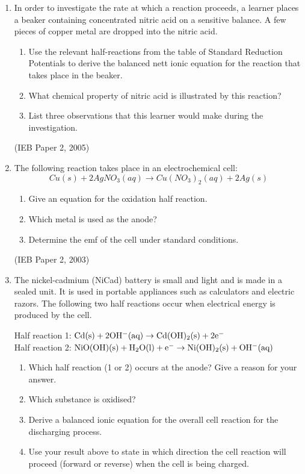 {\begin{enumerate}
\begin{enumerate}
	\end{enumerate}


\item{In order to investigate the rate at which a reaction proceeds, a learner places a beaker containing concentrated nitric acid on a sensitive balance. A few pieces of copper metal are dropped into the nitric acid. }
	\begin{enumerate}
	\item{Use the relevant half-reactions from the table of Standard Reduction Potentials to derive the balanced nett ionic equation for the reaction that takes place in the beaker.}
	\item{What chemical property of nitric acid is illustrated by this reaction?}
	\item{List three observations that this learner would make during the investigation.}
	\end{enumerate}
(IEB Paper 2, 2005)
\item{The following reaction takes place in an electrochemical cell:
\begin{equation*}
Cu(s) + 2AgNO_{3}(aq) \rightarrow Cu(NO_{3})_{2}(aq) + 2Ag(s)
\end{equation*}

	\begin{enumerate}
	\item{Give an equation for the oxidation half reaction.}
	\item{Which metal is used as the anode?}
	\item{Determine the emf of the cell under standard conditions.}
	\end{enumerate}
}
(IEB Paper 2, 2003)
\item{The nickel-cadmium (NiCad) battery is small and light and is made in a sealed unit. It is used in portable appliances such as calculators and electric razors. The following two half reactions occur when electrical energy is produced by the cell.}

Half reaction 1: $\rm{Cd(s) + 2OH^{-}(aq) \rightarrow Cd(OH)_{2}(s) + 2e^{-}}$\\

Half reaction 2: $\rm{NiO(OH)(s) + H_{2}O(l) + e^{-} \rightarrow Ni(OH)_{2}(s) + OH^{-}(aq)}$

	\begin{enumerate}
	\item{Which half reaction (1 or 2) occurs at the anode? Give a reason for your answer.}
	\item{Which substance is oxidised?}
	\item{Derive a balanced ionic equation for the overall cell reaction for the discharging process.}
	\item{Use your result above to state in which direction the cell reaction will proceed (forward or reverse) when the cell is being charged.}
	\end{enumerate}


\end{enumerate}}
